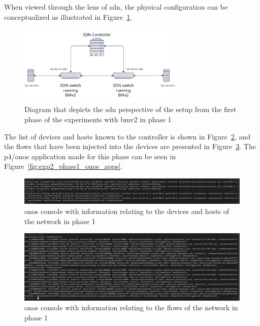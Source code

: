 When viewed through the lens of \gls{sdn}, the physical configuration can be conceptualized as illustrated in Figure~\ref{fig:exp2_phase1_sdn_diagram}.

\begin{figure}
	\centering
	\includegraphics[width=0.7\textwidth]{Chapters/Figures/tests/bmv2_phase_1/sdn_diagram.PNG}
	\caption{Diagram that depicts the \gls{sdn} perspective of the setup from the first phase of the experiments with \gls{bmv2} in phase 1}
	\label{fig:exp2_phase1_sdn_diagram}
\end{figure}

The list of devices and hosts known to the controller is shown in Figure~\ref{fig:exp2_phase1_onos}, and the flows that have been injected into the devices are presented in Figure~\ref{fig:exp2_phase1_onos_flows}. The \gls{p4}/\gls{onos} application made for this phase can be seen in Figure~\ref{fig:exp2_phase1_onos_apps}.

\begin{figure}
	\centering
	\includegraphics[width=\textwidth]{Chapters/Figures/tests/bmv2_phase_1/onos_topology.PNG}
	\caption{\gls{onos} console with information relating to the devices and hosts of the network in phase 1}
	\label{fig:exp2_phase1_onos}
\end{figure}

\begin{figure}
	\centering
	\includegraphics[width=\textwidth]{Chapters/Figures/tests/bmv2_phase_1/flows.PNG}
	\caption{\gls{onos} console with information relating to the flows of the network in phase 1}
	\label{fig:exp2_phase1_onos_flows}
\end{figure}

